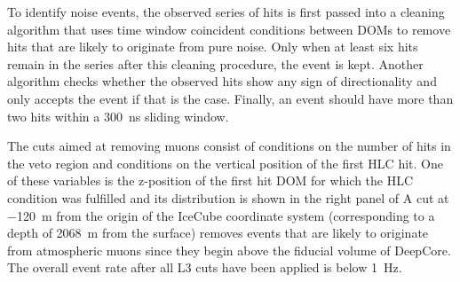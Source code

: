 To identify noise events, the observed series of hits is first passed into a cleaning algorithm that uses time window coincident conditions between DOMs to remove hits that are likely to originate from pure noise.
Only when at least six hits remain in the series after this cleaning procedure, the event is kept.
Another algorithm checks whether the observed hits show any sign of directionality and only accepts the event if that is the case.
Finally, an event should have more than two hits within a \SI{300}{\nano\second} sliding window.

The cuts aimed at removing muons consist of conditions on the number of hits in the veto region and conditions on the vertical position of the first HLC hit.
One of these variables is the z-position of the first hit DOM for which the HLC condition was fulfilled and its distribution is shown in the right panel of 
A cut at \SI{-120}{\metre} from the origin of the IceCube coordinate system (corresponding to a depth of \SI{2068}{\metre} from the surface) removes events that are likely to originate from atmospheric muons since they begin above the fiducial volume of DeepCore.
The overall event rate after all L3 cuts have been applied is below \SI{1}{\hertz}.

%     
%     

